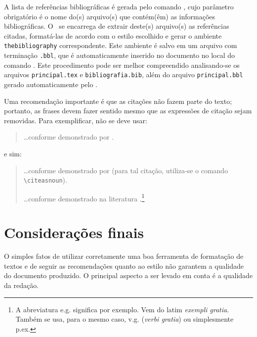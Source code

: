 A lista de referências bibliográficas é gerada pelo comando
\verb||, cujo parâmetro obrigatório é o nome do(s) arquivo(s)
que contém(êm) as informações bibliográficas.  O \BibTeX\ se encarrega
de extrair deste(s) arquivo(s) as referências citadas, formatá-las de acordo
com o estilo escolhido e gerar o ambiente \texttt{thebibliography}
correspondente. Este ambiente é salvo em um arquivo com terminação
\texttt{.bbl}, que é automaticamente inserido no documento no local do
comando \verb||. Este procedimento pode ser melhor
compreendido analisando-se os arquivos \texttt{principal.tex} e
\texttt{bibliografia.bib}, além do arquivo \texttt{principal.bbl}
gerado automaticamente pelo \BibTeX.

Uma recomendação importante é que as citações não fazem parte do
texto; portanto, as frases devem fazer sentido mesmo que as expressões
de citação sejam removidas. Para exemplificar, não se deve usar:
\begin{quotation}
\dots conforme demonstrado por \cite{art-solimaes03}.
\end{quotation}
e sim:
\begin{quotation}
\dots conforme demonstrado por  (para tal citação, utiliza-se o comando \verb|\citeasnoun|).

\dots conforme demonstrado na literatura
\cite[e.g. ]{art-solimaes03}.\footnote{A abreviatura e.g.
significa por exemplo. Vem do latim \emph{exempli gratia}. Também se
usa, para o mesmo caso, v.g. (\emph{verbi gratia}) ou simplesmente
p.ex.}
\end{quotation}

\section{Considerações finais}

O simples fatos de utilizar corretamente uma boa ferramenta de
formatação de textos e de seguir as recomendações quanto ao estilo
não garantem a qualidade do documento produzido. O principal
aspecto a ser levado em conta é a qualidade da redação.

